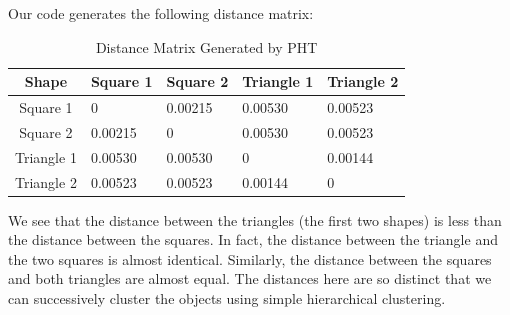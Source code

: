\documentclass[codesnippet]{jss}
\begin{document}
Our code generates the following distance matrix:
\begin{table}[]
\centering
\caption{Distance Matrix Generated by PHT}
\label{simptestdistl}
\begin{tabular}{@{}c|llll@{}}
\toprule
Shape                           & Square 1 & Square 2 & Triangle 1 & Triangle 2 \\ \midrule
Square 1                        & 0        & 0.00215  & 0.00530    & 0.00523    \\
Square 2                        & 0.00215  & 0        & 0.00530    & 0.00523    \\
Triangle 1                      & 0.00530  & 0.00530  & 0          & 0.00144    \\
\multicolumn{1}{l|}{Triangle 2} & 0.00523  & 0.00523  & 0.00144    & 0          \\ \bottomrule
\end{tabular}
\end{table}

We see that the distance between the triangles (the first two shapes) is less than the distance between the squares.  In fact, the distance between the triangle and the two squares is almost identical.  Similarly, the distance between the squares and both triangles are almost equal.  The distances here are so distinct that we can successively cluster the objects using simple hierarchical clustering.  
\end{document}
